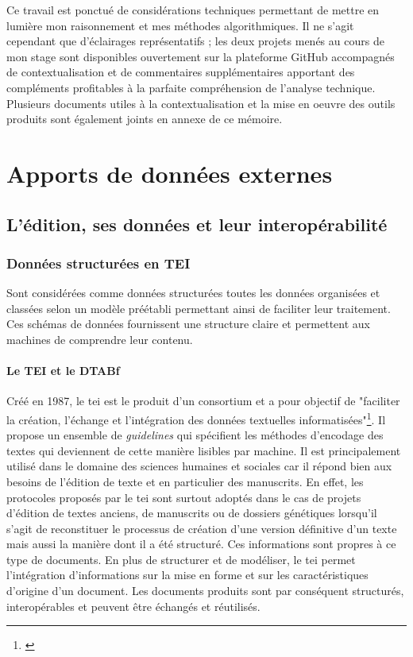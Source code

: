 \documentclass[a4paper, 12pt, twoside]{book}
\begin{document}
Ce travail est ponctué de considérations techniques permettant de mettre en lumière mon raisonnement et mes méthodes algorithmiques. Il ne s'agit cependant que d'éclairages représentatifs ; les deux projets menés au cours de mon stage sont disponibles ouvertement sur la plateforme GitHub accompagnés de contextualisation et de commentaires supplémentaires apportant des compléments profitables à la parfaite compréhension de l'analyse technique. Plusieurs documents utiles à la contextualisation et la mise en oeuvre des outils produits sont également joints en annexe de ce mémoire.


\part{Apports de données externes}
\label{part:donnéesExternes}
\chapter{L'édition, ses données et leur interopérabilité}
\label{chap:édition et données tierces}
\section{Données structurées en TEI}
Sont considérées comme données structurées toutes les données organisées et classées selon un modèle préétabli permettant ainsi de faciliter leur traitement. Ces schémas de données fournissent une structure claire et permettent aux machines de comprendre leur contenu. 
\subsection{Le TEI et le DTABf}
\label{sub: tei_dtabf}
Créé en 1987, le \gls{tei} est le produit d'un consortium et a pour objectif de "faciliter la création, l'échange et l'intégration des données textuelles informatisées"\footnote{\cite[chap. 10]{vitali-rosati_pratiques_2014}}. Il propose un ensemble de \textit{guidelines} qui spécifient les méthodes d'encodage des textes qui deviennent de cette manière lisibles par machine. Il est principalement utilisé dans le domaine des sciences humaines et sociales car il répond bien aux besoins de l'édition de texte et en particulier des manuscrits. En effet, les protocoles proposés par le \gls{tei} sont surtout adoptés dans le cas de projets d'édition de textes anciens, de manuscrits ou de dossiers génétiques lorsqu'il s'agit de reconstituer le processus de création d'une version définitive d'un texte mais aussi la manière dont il a été structuré. Ces informations sont propres à ce type de documents. En plus de structurer et de modéliser, le \gls{tei} permet l'intégration d'informations sur la mise en forme et sur les caractéristiques d'origine d'un document. Les documents produits sont par conséquent structurés, interopérables et peuvent être échangés et réutilisés.
\end{document}
